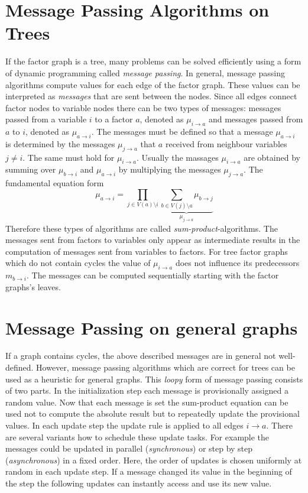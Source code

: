 \section{Message Passing Algorithms on Trees}

If the factor graph is a tree, many problems can be solved efficiently using a form of dynamic programming called \emph{message passing}. \newline 
In general, message passing algorithms compute values for each edge of the factor graph. These values can be interpreted as \emph{messages} that are sent between the nodes. Since all edges connect factor nodes to variable nodes there can be two types of messages: messages passed from a variable $i$ to a factor $a$, denoted as $\mu_{i \rightarrow a}$ and messages passed from $a$ to $i$, denoted as $\mu_{a \rightarrow i}$. \newline
The messages must be defined so that a message $\mu_{a \rightarrow i}$ is determined by the messages $\mu_{j \rightarrow a}$ that $a$ received from neighbour variables $j \neq i$. 
The same must hold for $\mu_{i \rightarrow a}$. \newline
Usually the massages $\mu_{i \rightarrow a}$ are obtained by summing over $\mu_{b \rightarrow i}$ and $\mu_{a \rightarrow i}$ by multiplying the messages $\mu_{j \rightarrow a}$. The fundamental equation form $$\mu_{a \rightarrow i} = \prod_{j \in V(a) \setminus i} \underbrace{\sum_{b \in V(j) \setminus a} \mu_{b \rightarrow j}}_{\mu_{j \rightarrow a}}$$ Therefore these types of algorithms are called \emph{sum-product}-algorithms. The messages sent from factors to variables only appear as intermediate results in the computation of messages sent from variables to factors. \newline
For tree factor graphs which do not contain cycles the value of $\mu_{i \rightarrow a}$ does not influence its predecessors $m_{b \rightarrow i}$. The messages can be computed sequentially starting with the factor graphs's leaves.


\section{Message Passing on general graphs}
If a graph contains cycles, the above described messages are in general not well-defined. However, message passing algorithms which are correct for trees can be used as a heuristic for general graphs. \newline
This \emph{loopy} form of message passing consists of two parts. In the initialization  step each message is provisionally assigned a random value. Now that each message is set the sum-product equation can be used not to compute the absolute result but to repeatedly update the provisional values. In each update step the update rule is applied to all edges $i \rightarrow a$. There are several variants how to schedule these update tasks. For example the messages could be updated in parallel (\emph{synchronous}) or step by step (\emph{asynchronous}) in a fixed order. Here, the order of updates is chosen uniformly at random in each update step. If a message changed its value in the beginning of the step the following updates can instantly access and use its new value. 

